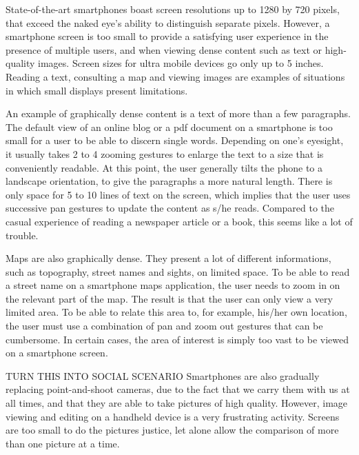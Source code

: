 State-of-the-art smartphones boast screen resolutions up to 1280 by 720 pixels, that exceed the naked eye's ability to distinguish separate pixels.
However, a smartphone screen is too small to provide a satisfying user experience in the presence of multiple users, and when viewing dense content such as text or high-quality images.
Screen sizes for ultra mobile devices go only up to 5 inches.
Reading a text, consulting a map and viewing images are examples of situations in which small displays present limitations.

An example of graphically dense content is a text of more than a few paragraphs.
The default view of an online blog or a pdf document on a smartphone is too small for a user to be able to discern single words.
Depending on one's eyesight, it usually takes 2 to 4 zooming gestures to enlarge the text to a size that is conveniently readable.
At this point, the user generally tilts the phone to a landscape orientation, to give the paragraphs a more natural length.
There is only space for 5 to 10 lines of text on the screen, which implies that the user uses successive pan gestures to update the content as s/he reads.
Compared to the casual experience of reading a newspaper article or a book, this seems like a lot of trouble.

Maps are also graphically dense.
They present a lot of different informations, such as topography, street names and sights, on limited space.
To be able to read a street name on a smartphone maps application, the user needs to zoom in on the relevant part of the map.
The result is that the user can only view a very limited area.
To be able to relate this area to, for example, his/her own location, the user must use a combination of pan and zoom out gestures that can be cumbersome.
In certain cases, the area of interest is simply too vast to be viewed on a smartphone screen.

TURN THIS INTO SOCIAL SCENARIO
Smartphones are also gradually replacing point-and-shoot cameras, due to the fact that we carry them with us at all times, and that they are able to take pictures of high quality.
However, image viewing and editing on a handheld device is a very frustrating activity.
Screens are too small to do the pictures justice, let alone allow the comparison of more than one picture at a time.

